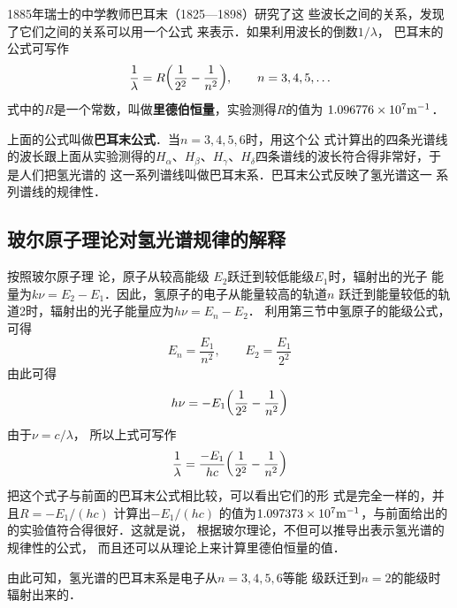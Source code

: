 1885年瑞士的中学教师巴耳末（1825—1898）研究了这
些波长之间的关系，发现了它们之间的关系可以用一个公式
来表示．如果利用波长的倒数$1/\lambda$，
巴耳末的公式可写作
\[\frac{1}{\lambda}=R\qty(\frac{1}{2^2}-\frac{1}{n^2}),\qquad n=3,4,5,\ldots\]
式中的$R$是一个常数，叫做\textbf{里德伯恒量}，实验测得$R$的值为
$1.096776\times10^7{\rm m^{-1}}$．

上面的公式叫做\textbf{巴耳末公式}．当$n=3,4,5,6$时，用这个公
式计算出的四条光谱线的波长跟上面从实验测得的$H_{\alpha}$、$H_{\beta}$、$H_{\gamma}$、$H_{\delta}$四条谱线的波长符合得非常好，于是人们把氢光谱的
这一系列谱线叫做巴耳末系．巴耳末公式反映了氢光谱这一
系列谱线的规律性．

\subsection{玻尔原子理论对氢光谱规律的解释} 

按照玻尔原子理
论，原子从较高能级 $E_2$跃迁到较低能级$E_1$时，辐射出的光子
能量为$k\nu =E_2-E_1$．因此，氢原子的电子从能量较高的轨道$n$
跃迁到能量较低的轨道2时，辐射出的光子能量应为$h\nu=E_n-E_2$．
利用第三节中氢原子的能级公式，可得
\[E_n=\frac{E_1}{n^2},\qquad E_2=\frac{E_1}{2^2} \]
由此可得\[h\nu=-E_1\qty( \frac{1}{2^2}-\frac{1}{n^2} )\]
由于$\nu=c/\lambda$，
所以上式可写作
\[\frac{1}{\lambda}=\frac{-E_1}{hc}\qty( \frac{1}{2^2}-\frac{1}{n^2})\]
把这个式子与前面的巴耳末公式相比较，可以看出它们的形
式是完全一样的，并且$R=-E_1/(hc)$
计算出$-E_1/(hc)$
的值为$1.097373\times10^7{\rm m^{-1}}$，与前面给出的的实验值符合得很好．这就是说，
根据玻尔理论，不但可以推导出表示氢光谱的规律性的公式，
而且还可以从理论上来计算里德伯恒量的值．

由此可知，氢光谱的巴耳末系是电子从$n=3,4,5,6$等能
级跃迁到$n=2$的能级时辐射出来的．

